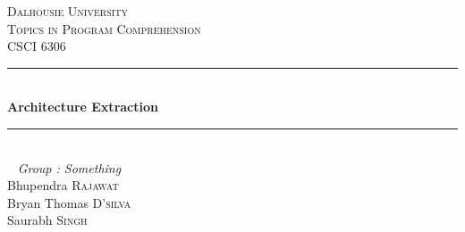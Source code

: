 \begin{titlepage}

\newcommand{\HRule}{\rule{\linewidth}{0.5mm}} %

\center %
 

\textsc{\LARGE Dalhousie University}\\[1.5cm] %
\textsc{\Large Topics in Program Comprehension}\\[0.5cm] %
\textsc{\large CSCI 6306}\\[0.5cm] %


\HRule \\[0.4cm]
{ \huge \bfseries Architecture Extraction}\\[0.4cm] %
\HRule \\[1.5cm]
 

~
\emph{Group : Something} \\
Bhupendra \textsc{Rajawat} \\
Bryan Thomas \textsc{D'silva}\\ %
Saurabh \textsc{Singh}\\
\bigskip



\end{titlepage}
